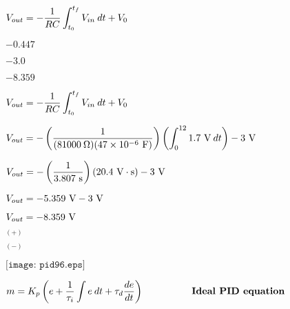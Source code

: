\documentclass[12pt,a4paper,margin=2cm]{book}
\def\lthtmlcheckvsize{\ifdim\ht\sizebox<\vsize 
  \ifdim\wd\sizebox<\hsize\expandafter\hfill\fi \expandafter\vfill
  \else\expandafter\vss\fi}%
\begin{document}
{\newpage\clearpage
{}%
$\displaystyle V_{out} = -{1 \over RC} \int_{t_0}^{t_f} V_{in} \> dt + V_0$%
\lthtmlindisplaymathZ
\lthtmlcheckvsize\clearpage}

{\newpage\clearpage
{}%
$ -0.447$%
\lthtmlindisplaymathZ
\lthtmlcheckvsize\clearpage}

{\newpage\clearpage
{}%
$ -3.0$%
\lthtmlindisplaymathZ
\lthtmlcheckvsize\clearpage}

{\newpage\clearpage
{}%
$ -8.359$%
\lthtmlindisplaymathZ
\lthtmlcheckvsize\clearpage}

{\newpage\clearpage
{}%
$\displaystyle V_{out} = -{1 \over RC} \int_{t_{0}}^{t_{f}} V_{in} \> dt + V_0$%
\lthtmlindisplaymathZ
\lthtmlcheckvsize\clearpage}

{\newpage\clearpage
{}%
$\displaystyle V_{out} = -\left({1 \over (81000 \> \Omega)(47 \times 10^{-6} \hbox{ F})}\right) \left(\int_0^{12} 1.7 \hbox{ V} \> dt \right) - 3 \hbox{ V}$%
\lthtmlindisplaymathZ
\lthtmlcheckvsize\clearpage}

{\newpage\clearpage
{}%
$\displaystyle V_{out} = -\left({1 \over 3.807 \hbox{ s}}\right) (20.4 \hbox{ V} \cdot \hbox{s}) - 3 \hbox{ V}$%
\lthtmlindisplaymathZ
\lthtmlcheckvsize\clearpage}

{\newpage\clearpage
{}%
$\displaystyle V_{out} = - 5.359 \hbox{ V} - 3 \hbox{ V}$%
\lthtmlindisplaymathZ
\lthtmlcheckvsize\clearpage}

{\newpage\clearpage
{}%
$\displaystyle V_{out} = - 8.359 \hbox{ V}$%
\lthtmlindisplaymathZ
\lthtmlcheckvsize\clearpage}

{\newpage\clearpage
{}%
$ _{(+)}$%
\lthtmlindisplaymathZ
\lthtmlcheckvsize\clearpage}

{\newpage\clearpage
{}%
$ _{(-)}$%
\lthtmlindisplaymathZ
\lthtmlcheckvsize\clearpage}

{\newpage\clearpage
{}%
$\displaystyle \texttt{[image: pid96.eps]}$%
\lthtmlindisplaymathZ
\lthtmlcheckvsize\clearpage}

{\newpage\clearpage
{}%
$\displaystyle m = K_p \left(e + {1 \over \tau_i} \int e \> dt + \tau_d {de \over dt} \right) \hbox{\hskip 50pt \textbf{Ideal PID equation}}$%
\lthtmlindisplaymathZ
\lthtmlcheckvsize\clearpage}
\end{document}
